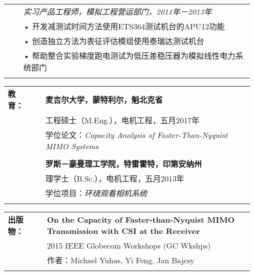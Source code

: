 \documentclass{minimal}
\begin{document}
\begin{CJK*}{UTF8}{gbsn}
\begin{tabular}{ p{1.5cm} p{1cm} p{16cm} }
& & \textit{实习产品工程师，模拟工程营运部门，2011年－2013年}\\
& & • 开发减测试时间方法使用ETS364测试机台的APU12功能\\
& & • 创造独立方法为表征评估模组使用泰瑞达测试机台\\
& & • 帮助整合实验梯度跑电测试为低压差稳压器为模拟线性电力系统部门\\
& & \\
\end{tabular}

\begin{tabular}{ p{1.5cm} p{1cm} p{16cm} }
\textbf{教育：} & & \textbf{麦吉尔大学，蒙特利尔，魁北克省} \\
& & 工程硕士（M.Eng.），电机工程，五月2017年\\
& & 学位论文：\textit{Capacity Analysis of Faster-Than-Nyquist MIMO Systems}\\
& & \\
& & \textbf{罗斯－豪曼理工学院，特雷霍特，印第安纳州} \\
& & 理学士（B.Sc.），电机工程，五月2013年\\
& & 学位项目：\textit{环绕观看相机系统}\\
& & \\
\end{tabular}

\begin{tabular}{ p{1.5cm} p{1cm} p{16cm} }
\textbf{出版物：} & & \textbf{On the Capacity of Faster-than-Nyquist MIMO Transmission with CSI at the Receiver}\\
& & 2015 IEEE Globecom Workshops (GC Wkshps)\\
& & 作者：Michael Yuhas, Yi Feng, Jan Bajcsy\\
& & \\
\end{tabular}

\clearpage\end{CJK*}
\end{document}
